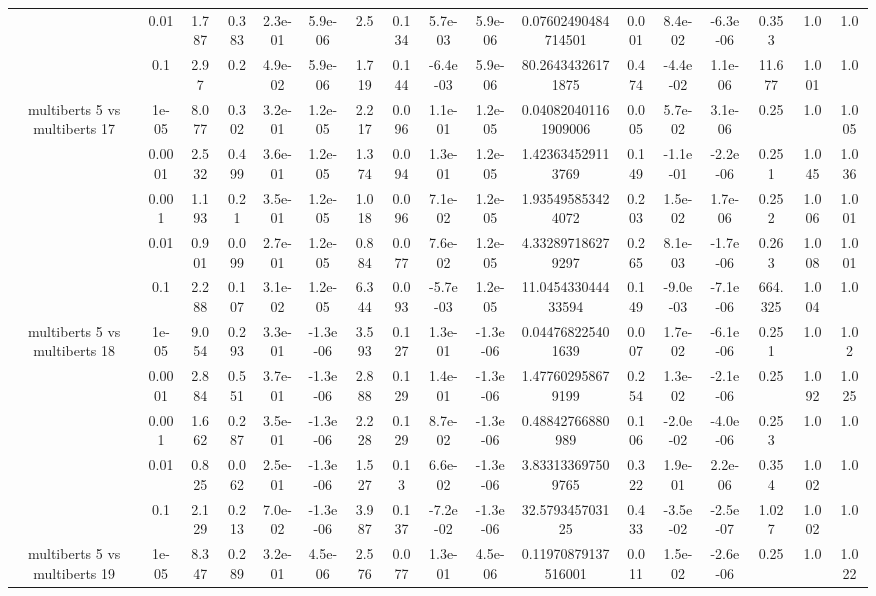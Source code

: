 \begin{tabular}{|c|c|c|c|c|c|c|c|c|c|c|c|c|c|c|c|c|}
 & 0.01 & 1.787 & 0.383 & 2.3e-01 & 5.9e-06 & 2.5 & 0.134 & 5.7e-03 & 5.9e-06 & 0.07602490484714501 & 0.001 & 8.4e-02 & -6.3e-06 & 0.353 & 1.0 & 1.0 \\
 & 0.1 & 2.97 & 0.2 & 4.9e-02 & 5.9e-06 & 1.719 & 0.144 & -6.4e-03 & 5.9e-06 & 80.26434326171875 & 0.474 & -4.4e-02 & 1.1e-06 & 11.677 & 1.001 & 1.0 \\
\hline
\multirow{5}{*}{multiberts 5 vs multiberts 17} & 1e-05 & 8.077 & 0.302 & 3.2e-01 & 1.2e-05 & 2.217 & 0.096 & 1.1e-01 & 1.2e-05 & 0.040820401161909006 & 0.005 & 5.7e-02 & 3.1e-06 & 0.25 & 1.0 & 1.005 \\
 & 0.0001 & 2.532 & 0.499 & 3.6e-01 & 1.2e-05 & 1.374 & 0.094 & 1.3e-01 & 1.2e-05 & 1.423634529113769 & 0.149 & -1.1e-01 & -2.2e-06 & 0.251 & 1.045 & 1.036 \\
 & 0.001 & 1.193 & 0.21 & 3.5e-01 & 1.2e-05 & 1.018 & 0.096 & 7.1e-02 & 1.2e-05 & 1.935495853424072 & 0.203 & 1.5e-02 & 1.7e-06 & 0.252 & 1.006 & 1.001 \\
 & 0.01 & 0.901 & 0.099 & 2.7e-01 & 1.2e-05 & 0.884 & 0.077 & 7.6e-02 & 1.2e-05 & 4.332897186279297 & 0.265 & 8.1e-03 & -1.7e-06 & 0.263 & 1.008 & 1.001 \\
 & 0.1 & 2.288 & 0.107 & 3.1e-02 & 1.2e-05 & 6.344 & 0.093 & -5.7e-03 & 1.2e-05 & 11.045433044433594 & 0.149 & -9.0e-03 & -7.1e-06 & 664.325 & 1.004 & 1.0 \\
\hline
\multirow{5}{*}{multiberts 5 vs multiberts 18} & 1e-05 & 9.054 & 0.293 & 3.3e-01 & -1.3e-06 & 3.593 & 0.127 & 1.3e-01 & -1.3e-06 & 0.044768225401639 & 0.007 & 1.7e-02 & -6.1e-06 & 0.251 & 1.0 & 1.02 \\
 & 0.0001 & 2.884 & 0.551 & 3.7e-01 & -1.3e-06 & 2.888 & 0.129 & 1.4e-01 & -1.3e-06 & 1.477602958679199 & 0.254 & 1.3e-02 & -2.1e-06 & 0.25 & 1.092 & 1.025 \\
 & 0.001 & 1.662 & 0.287 & 3.5e-01 & -1.3e-06 & 2.228 & 0.129 & 8.7e-02 & -1.3e-06 & 0.48842766880989 & 0.106 & -2.0e-02 & -4.0e-06 & 0.253 & 1.0 & 1.0 \\
 & 0.01 & 0.825 & 0.062 & 2.5e-01 & -1.3e-06 & 1.527 & 0.13 & 6.6e-02 & -1.3e-06 & 3.833133697509765 & 0.322 & 1.9e-01 & 2.2e-06 & 0.354 & 1.002 & 1.0 \\
 & 0.1 & 2.129 & 0.213 & 7.0e-02 & -1.3e-06 & 3.987 & 0.137 & -7.2e-02 & -1.3e-06 & 32.579345703125 & 0.433 & -3.5e-02 & -2.5e-07 & 1.027 & 1.002 & 1.0 \\
\hline
\multirow{5}{*}{multiberts 5 vs multiberts 19} & 1e-05 & 8.347 & 0.289 & 3.2e-01 & 4.5e-06 & 2.576 & 0.077 & 1.3e-01 & 4.5e-06 & 0.11970879137516001 & 0.011 & 1.5e-02 & -2.6e-06 & 0.25 & 1.0 & 1.022 \\

\end{tabular}
